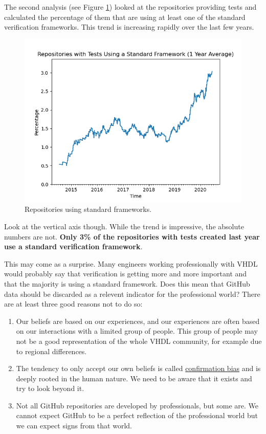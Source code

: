 \documentclass[]{article}
\providecommand{\tightlist}{%
  \setlength{\itemsep}{0pt}\setlength{\parskip}{0pt}}
\begin{document}
The second analysis (see Figure \ref{fig:standard}) looked at the repositories providing tests and calculated the percentage of them that are using at least one of the standard verification frameworks. This trend is increasing rapidly over the last few years.

\begin{figure}

{\centering \includegraphics[width=0.85\linewidth]{img/repositories_using_std_framework} 

}

\caption{Repositories using standard frameworks.}\label{fig:standard}
\end{figure}

Look at the vertical axis though. While the trend is impressive, the absolute numbers are not. \textbf{Only 3\% of the repositories with tests created last year use a standard verification framework}.

This may come as a surprise. Many engineers working professionally with VHDL would probably say that verification is getting more and more important and that the majority is using a standard framework. Does this mean that GitHub data should be discarded as a relevent indicator for the professional world? There are at least three good reasons not to do so:

\begin{enumerate}
\def\labelenumi{\arabic{enumi}.}
\tightlist
\item
  Our beliefs are based on our experiences, and our experiences are often based on our interactions with a limited group of people. This group of people may not be a good representation of the whole VHDL community, for example due to regional differences.
\item
  The tendency to only accept our own beliefs is called \href{https://en.wikipedia.org/wiki/Confirmation_bias}{confirmation bias} and is deeply rooted in the human nature. We need to be aware that it exists and try to look beyond it.
\item
  Not all GitHub repositories are developed by professionals, but some are. We cannot expect GitHub to be a perfect reflection of the professional world but we can expect signs from that world.
\end{enumerate}
\end{document}
